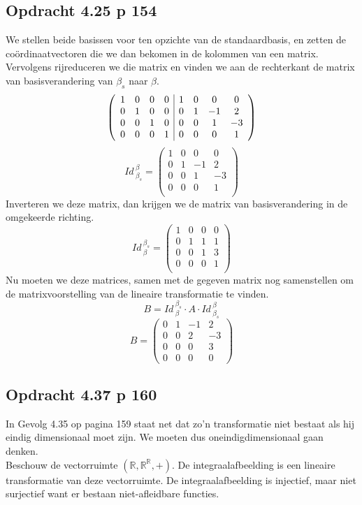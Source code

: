 \documentclass[lineaire_algebra_oplossingen.tex]{subfiles}
\begin{document}
\subsection{Opdracht 4.25 p 154} %
\label{4.25}
We stellen beide basissen voor ten opzichte van de standaardbasis, en zetten de co\"ordinaatvectoren die we dan bekomen in de kolommen van een matrix.
Vervolgens rijreduceren we die matrix en vinden we aan de rechterkant de matrix van basisverandering van $\beta_s$ naar $\beta$.
\[
\left(
\begin{array}{c c c c | c c c c}
1 & 0 & 0 & 0 & 1 & 0 & 0 & 0\\
0 & 1 & 0 & 0 & 0 & 1 & -1 & 2\\
0 & 0 & 1 & 0 & 0 & 0 & 1 & -3\\
0 & 0 & 0 & 1 & 0 & 0 & 0 & 1\\
\end{array}
\right)
\]
\[
\textit{Id}\,_{\beta_s}^\beta = 
\begin{pmatrix}
1 & 0 & 0 & 0\\
0 & 1 & -1 & 2\\
0 & 0 & 1 & -3\\
0 & 0 & 0 & 1\\
\end{pmatrix}
\]
Inverteren we deze matrix, dan krijgen we de matrix van basisverandering in de omgekeerde richting.
\[
\textit{Id}\,_{\beta}^{\beta_s} = 
\begin{pmatrix}
1 & 0 & 0 & 0\\
0 & 1 & 1 & 1\\
0 & 0 & 1 & 3\\
0 & 0 & 0 & 1\\
\end{pmatrix}
\]
Nu moeten we deze matrices, samen met de gegeven matrix nog samenstellen om de matrixvoorstelling van de lineaire transformatie te vinden.
\[
B = \textit{Id}\,_{\beta}^{\beta_s}\cdot  A\cdot \textit{Id}\,_{\beta_s}^\beta
\]
\[
B = 
\begin{pmatrix}
0 & 1 & -1 &2\\
0 & 0 & 2 &-3\\
0 & 0 & 0 & 3\\
0 & 0 & 0 & 0
\end{pmatrix}
\]

\subsection{Opdracht 4.37 p 160}
\label{4.37}
In Gevolg 4.35 op pagina 159 staat net dat zo'n transformatie niet bestaat als hij eindig dimensionaal moet zijn. We moeten dus oneindigdimensionaal gaan denken.\\
Beschouw de vectorruimte $(\mathbb{R},\mathbb{R}^\mathbb{R},+)$. De integraalafbeelding is een lineaire transformatie van deze vectorruimte. De integraalafbeelding is injectief, maar niet surjectief want er bestaan niet-afleidbare functies.
\end{document}
